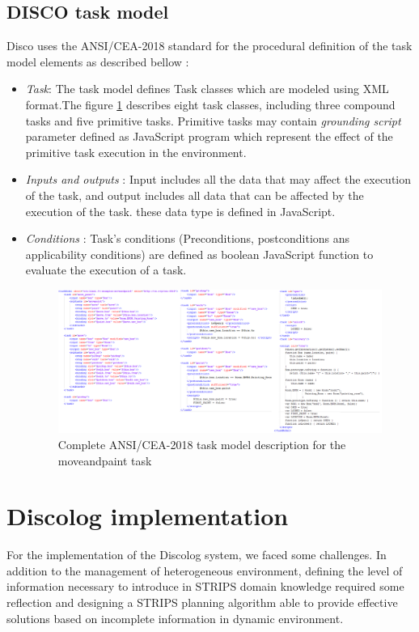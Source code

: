 \subsection{DISCO task model}
Disco uses the ANSI/CEA-2018 standard for the procedural definition of the task model elements as described bellow :
\begin{itemize}
	\item \textit{Task}: The task model defines Task classes which are modeled using XML format.The figure \ref{xmldisco} describes eight task classes, including three compound tasks and  five primitive tasks. Primitive tasks may contain \textit{grounding script} parameter defined as JavaScript program which represent the effect of  the primitive task execution in the environment.

	\item \textit{Inputs and outputs} : Input includes all the data that may affect the execution of the task, and output includes all data that can be affected by the execution of the task. these data type is defined in JavaScript.
	\item \textit{Conditions} : Task's conditions (Preconditions, postconditions ans applicability conditions) are defined as boolean JavaScript function to evaluate the execution of a task.
			\begin{figure}[!h]
				\centering
				\includegraphics[width=\columnwidth]{Pictures/xmldisco.png}
				\caption{\label{xmldisco} Complete ANSI/CEA-2018 task model description for the moveandpaint task}
			\end{figure}
\end{itemize}
\section{Discolog implementation}
For the implementation of the Discolog system, we  faced some challenges. In addition to the management of heterogeneous environment, defining the level of information necessary to introduce in STRIPS domain knowledge required some reflection and designing a STRIPS planning algorithm able to provide effective solutions based on incomplete information in dynamic environment.
